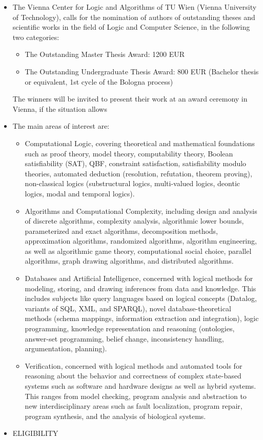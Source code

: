 \documentclass[prodmode,acmtecs]{acmsmall} %
\begin{document}
\begin{itemize}\item  The Vienna Center for Logic and Algorithms of TU Wien (Vienna University of Technology), calls for the nomination of authors of outstanding theses and scientific works in the field of Logic and Computer Science, in the following two categories: 
 
\begin{itemize}\item The Outstanding Master Thesis Award:  1200 EUR
\item The Outstanding Undergraduate Thesis Award: 800 EUR (Bachelor thesis or equivalent, 1st cycle of the Bologna process)
\end{itemize} 
  The winners will be invited to present their work at an award ceremony in Vienna, if the situation allows 
 
\item  The main areas of interest are: 
 
\begin{itemize}\item Computational Logic, covering theoretical and mathematical foundations such as proof theory, model theory, computability theory, Boolean satisfiability (SAT), QBF, constraint satisfaction, satisfiability modulo theories, automated deduction (resolution, refutation, theorem proving), non-classical logics (substructural logics, multi-valued logics, deontic logics, modal and temporal logics).
\item Algorithms and Computational Complexity, including design and analysis of discrete algorithms, complexity analysis, algorithmic lower bounds, parameterized and exact algorithms, decomposition methods, approximation algorithms, randomized algorithms, algorithm engineering, as well as algorithmic game theory, computational social choice, parallel algorithms, graph drawing algorithms, and distributed algorithms.
\item Databases and Artificial Intelligence, concerned with logical methods for modeling, storing, and drawing inferences from data and knowledge. This includes subjects like query languages based on logical concepts (Datalog, variants of SQL, XML, and SPARQL), novel database-theoretical methods (schema mappings, information extraction and integration), logic programming, knowledge representation and reasoning (ontologies, answer-set programming, belief change, inconsistency handling, argumentation, planning).
\item Verification, concerned with logical methods and automated tools for reasoning about the behavior and correctness of complex state-based systems such as software and hardware designs as well as hybrid systems. This ranges from model checking, program analysis and abstraction to new interdisciplinary areas such as fault localization, program repair, program synthesis, and the analysis of biological systems.
\end{itemize} 
\item  ELIGIBILITY 
 

\end{itemize}
\end{document}
